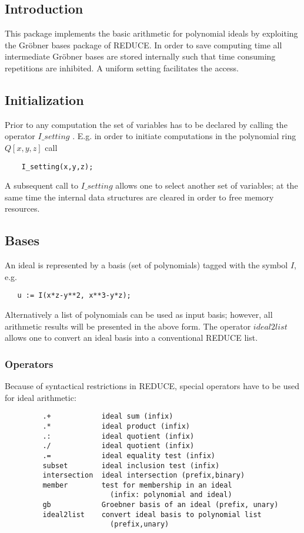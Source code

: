 

\subsection{Introduction}

This package implements the basic arithmetic for polynomial ideals
by exploiting the Gr\"obner bases package of REDUCE.
In order to save computing time all intermediate Gr\"obner bases
are stored internally such that time consuming repetitions
are inhibited. A uniform setting facilitates the access.

\subsection{Initialization}

Prior to any computation the set of variables has to be declared
by calling the operator $I\_setting$ . E.g. in order to initiate
computations in the polynomial ring $Q[x,y,z]$ call
\begin{verbatim}
    I_setting(x,y,z);
\end{verbatim}
A subsequent call to $I\_setting$ allows one to select another set
of variables; at the same time the internal data structures
are cleared in order to free memory resources.

\subsection{Bases}

An ideal is represented by a basis (set of polynomials) tagged
with the symbol $I$, e.g.
\begin{verbatim}
   u := I(x*z-y**2, x**3-y*z);
\end{verbatim}
Alternatively a list of polynomials can be used as input basis; however,
all arithmetic results will be presented in the above form. The
operator $ideal2list$ allows one to convert an ideal basis into a
conventional REDUCE list.

\subsubsection{Operators}

Because of syntactical restrictions in REDUCE, special operators
have to be used for ideal arithmetic: 

\begin{verbatim}
         .+            ideal sum (infix)
         .*            ideal product (infix)
         .:            ideal quotient (infix)
         ./            ideal quotient (infix)
         .=            ideal equality test (infix)
         subset        ideal inclusion test (infix)
         intersection  ideal intersection (prefix,binary)
         member        test for membership in an ideal
                         (infix: polynomial and ideal)
         gb            Groebner basis of an ideal (prefix, unary)
         ideal2list    convert ideal basis to polynomial list 
                         (prefix,unary)
\end{verbatim}


